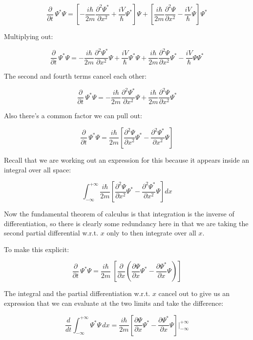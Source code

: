 $$
\frac{\partial}{\partial t} \, \Psi^*\Psi
=
\left[
- \frac{i \hbar}{2m} \frac{\partial^2 \Psi^*}{\partial x^2}
+ \frac{i V}{\hbar}\Psi^*
\right] \Psi
+
\left[
\frac{i \hbar}{2m} \frac{\partial^2 \Psi}{\partial x^2}
- \frac{i V}{\hbar}\Psi
\right] \Psi^*
$$

Multiplying out:

$$
\frac{\partial}{\partial t} \, \Psi^*\Psi
=
- \frac{i \hbar}{2m} \frac{\partial^2 \Psi^*}{\partial x^2}
\Psi
+ \frac{i V}{\hbar}\Psi^*\Psi
+
\frac{i \hbar}{2m} \frac{\partial^2 \Psi}{\partial x^2}
\Psi^*
- \frac{i V}{\hbar}\Psi\Psi^*
$$

The second and fourth terms cancel each other:

$$
\frac{\partial}{\partial t} \, \Psi^*\Psi
=
- \frac{i \hbar}{2m} \frac{\partial^2 \Psi^*}{\partial x^2}
\Psi
+
\frac{i \hbar}{2m} \frac{\partial^2 \Psi}{\partial x^2}
\Psi^*
$$

Also there's a common factor we can pull out:

$$
\frac{\partial}{\partial t} \, \Psi^*\Psi
=
\frac{i \hbar}{2m}
\left[
\frac{\partial^2 \Psi}{\partial x^2}\Psi^*
- \frac{\partial^2 \Psi^*}{\partial x^2}\Psi
\right]
$$

Recall that we are working out an expression for this because it appears inside an integral over all space:

$$
\int_{-\infty}^{+\infty}
\frac{i \hbar}{2m}
\left[
\frac{\partial^2 \Psi}{\partial x^2}\Psi^*
- \frac{\partial^2 \Psi^*}{\partial x^2}\Psi
\right]
dx
$$

Now the fundamental theorem of calculus is that integration is the inverse of differentiation, so there is clearly some redundancy here in that we are taking the second partial differential w.r.t. $x$ only to then integrate over all $x$.

To make this explicit:

\begin{equation}  
\frac{\partial}{\partial t} \, \Psi^*\Psi
=
\frac{i \hbar}{2m} \
\left[
\frac{\partial}{\partial x}
\left(
\frac{\partial \Psi}{\partial x}\Psi^*
- \frac{\partial \Psi^*}{\partial x}\Psi
\right)
\right]
\label{eqn:qm-byparts}
\end{equation}

The integral and the partial differentiation w.r.t. $x$ cancel out to give us an expression that we can evaluate at the two limits and take the difference:

$$
\frac{d}{d t}
\int_{-\infty}^{+\infty}
\Psi^*\Psi
\,dx
=
\frac{i \hbar}{2m}
\left[
\frac{\partial \Psi}{\partial x}\Psi^*
- \frac{\partial \Psi^*}{\partial x}\Psi
\right]
\bigg\rvert_{-\infty}^{+\infty}
$$

